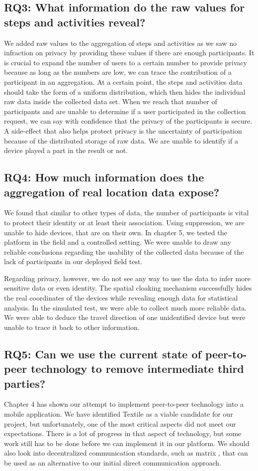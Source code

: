 \subsection*{RQ3: What information do the raw values for steps and activities reveal?}
We added raw values to the aggregation of steps and activities as we saw no infraction on privacy by providing these values if there are enough participants. It is crucial to expand the number of users to a certain number to provide privacy because as long as the numbers are low, we can trace the contribution of a participant in an aggregation. At a certain point, the steps and activities data should take the form of a uniform distribution, which then hides the individual raw data inside the collected data set. When we reach that number of participants and are unable to determine if a user participated in the collection request, we can say with confidence that the privacy of the participants is secure. A side-effect that also helps protect privacy is the uncertainty of participation because of the distributed storage of raw data. We are unable to identify if a device played a part in the result or not.

\subsection*{RQ4: How much information does the aggregation of real location data expose?}
We found that similar to other types of data, the number of participants is vital to protect their identity or at least their association. Using suppression, we are unable to hide devices, that are on their own. In chapter 5, we tested the platform in the field and a controlled setting. We were unable to draw any reliable conclusions regarding the usability of the collected data because of the lack of participants in our deployed field test.

Regarding privacy, however, we do not see any way to use the data to infer more sensitive data or even identity. The spatial cloaking mechanism successfully hides the real coordinates of the devices while revealing enough data for statistical analysis. In the simulated test, we were able to collect much more reliable data. We were able to deduce the travel direction of one unidentified device but were unable to trace it back to other information.

\subsection*{RQ5: Can we use the current state of peer-to-peer technology to remove intermediate third parties?}
Chapter 4 has shown our attempt to implement peer-to-peer technology into a mobile application. We have identified Textile as a viable candidate for our project, but unfortunately, one of the most critical aspects did not meet our expectations. There is a lot of progress in that aspect of technology, but some work still has to be done before we can implement it in our platform. We should also look into decentralized communication standards, such as matrix \cite{matrix}, that can be used as an alternative to our initial direct communication approach.

